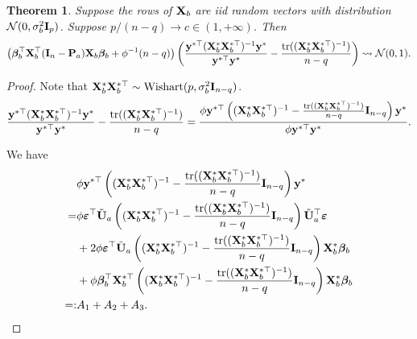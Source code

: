 \documentclass[11pt]{article}
\DeclareMathOperator{\mytr}{tr}
\newcommand{\By}{\mathbf{y}}    \newcommand{\Bz}{\mathbf{z}}
\newcommand{\bfsym}[1]{\ensuremath{\boldsymbol{#1}}}
\def\bbeta{\bfsym \beta}
\theoremstyle{plain}
\newtheorem{theorem}{\quad\quad Theorem}
\theoremstyle{definition}
\theoremstyle{remark}
\begin{document}
\begin{appendices}
\begin{theorem}\label{generalTheorem}
    Suppose the rows of $\mathbf{X}_b$ are iid random vectors with distribution $\mathcal N(0,\sigma_b^2\mathbf{I}_p)$.
    Suppose $p/(n-q)\to c \in (1,+\infty)$.
    Then
\begin{equation*}
    \left(
    \bbeta_b^\top \BX_b^\top (\BI_n-\BP_a) \BX_b \bbeta_b
    + \phi^{-1}(n-q)
\right)
    \left(
        \frac{\By^{*\top} (\BX_b^* \BX_b^{*\top})^{-1} \By^*}{\By^{*\top} \By^*} -\frac{\mytr ((\BX_b^* \BX_b^{*\top})^{-1})}{n-q}
    \right)
    \rightsquigarrow \mathcal N(0,1).
\end{equation*}
\end{theorem}
\begin{proof}
    Note that $\mathbf{X}_b^* \mathbf{X}_b^{*\top} \sim \text{Wishart}(p,\sigma_b^2 \mathbf{I}_{n-q})$.
    \begin{equation*}
        \frac{\By^{*\top} (\BX_b^* \BX_b^{*\top})^{-1} \By^*}{\By^{*\top} \By^*} -\frac{\mytr ((\BX_b^* \BX_b^{*\top})^{-1})}{n-q}
        =
        \frac{\phi\By^{*\top}\left( (\BX_b^* \BX_b^{*\top})^{-1} 
                -\frac{\mytr ( (\BX_b^* \BX_b^{*\top})^{-1})}{n-q} 
                \BI_{n-q}
        \right) \By^*}{\phi\By^{*\top} \By^*}.
    \end{equation*}

We have
\begin{equation*}
    \begin{split}
&
\phi\By^{*\top}\left( (\BX_b^* \BX_b^{*\top})^{-1} 
                -\frac{\mytr ( (\BX_b^* \BX_b^{*\top})^{-1})}{n-q} 
                \BI_{n-q}
        \right) \By^*
        \\
        =&
\phi
\bepsilon^{\top} \tilde \BU_a \left( (\BX_b^* \BX_b^{*\top})^{-1} 
                -\frac{\mytr ( (\BX_b^* \BX_b^{*\top})^{-1})}{n-q} 
                \BI_{n-q}
        \right) \tilde \BU_a^\top \bepsilon
        \\
        &+
2\phi\bepsilon^{\top} \tilde \BU_a \left( (\BX_b^* \BX_b^{*\top})^{-1} 
                -\frac{\mytr ( (\BX_b^* \BX_b^{*\top})^{-1})}{n-q} 
                \BI_{n-q}
            \right)  \BX_b^* \bbeta_b
        \\
        &+
\phi
 \bbeta_b^\top
 \BX_b^{*\top}
\left( (\BX_b^* \BX_b^{*\top})^{-1} 
                -\frac{\mytr ( (\BX_b^* \BX_b^{*\top})^{-1})}{n-q} 
                \BI_{n-q}
            \right)  \BX_b^* \bbeta_b
            \\
            =:& A_1 +A_2 +A_3.
    \end{split}
\end{equation*}


\end{proof}
\end{appendices}
\end{document}
